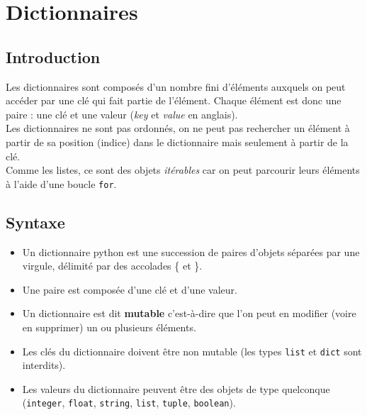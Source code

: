 \setchapterpreamble[u]{\margintoc}

\chapter{Dictionnaires}



\section{Introduction}

Les dictionnaires sont composés d'un nombre fini d'éléments auxquels on peut accéder par une clé qui fait partie de l'élément.
Chaque élément est donc une paire : une clé et une valeur (\textit{key} et \textit{value} en anglais).\\
Les dictionnaires ne sont pas ordonnés, on ne peut pas rechercher un élément à partir de sa position (indice) dans le dictionnaire mais seulement à partir de la clé.\\
Comme les listes, ce sont des objets \textit{itérables} car on peut parcourir leurs éléments à l'aide d'une boucle \lstinline{for}.


\section{Syntaxe}

\begin{itemize}
\item Un dictionnaire python est une succession de paires d'objets séparées par une virgule, délimité par des accolades \{ et \}.
\item Une paire est composée d'une clé et d'une valeur.%
\item Un dictionnaire est dit \textbf{mutable} c'est-à-dire que l'on peut en modifier (voire en supprimer) un ou plusieurs éléments.
\item Les clés du dictionnaire doivent être non mutable (les types \lstinline{list} et \lstinline{dict} sont interdits).
\item Les valeurs du dictionnaire peuvent être des objets de type quelconque (\lstinline{integer}, \lstinline{float}, \lstinline{string}, \lstinline{list}, \lstinline{tuple}, \lstinline{boolean}).
\end{itemize}

